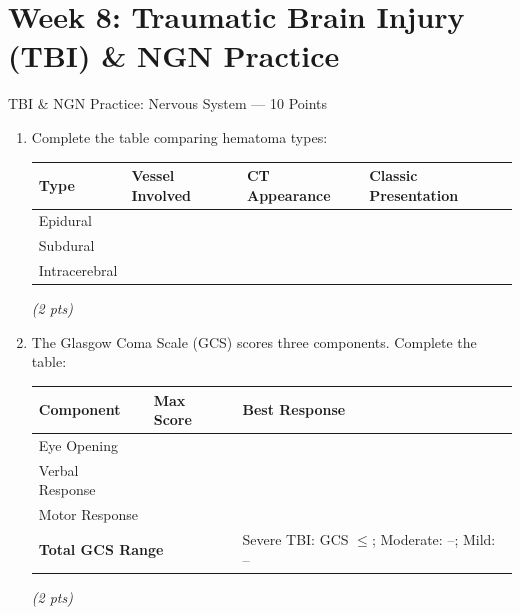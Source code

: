 \documentclass[11pt,letterpaper]{article}
\newcommand{\blank}[1][3cm]{\underline{\hspace{#1}}}
\begin{document}
\newpage

\section{Week 8: Traumatic Brain Injury (TBI) \& NGN Practice}

\begin{diagbox}{TBI \& NGN Practice: Nervous System --- 10 Points}

\begin{enumerate}[leftmargin=1.5em, label=\textbf{\arabic*.},start=81]

  \item Complete the table comparing hematoma types:

  \vspace{0.3cm}
  \begin{center}
  \renewcommand{\arraystretch}{1.7}
  \begin{tabular}{|p{3cm}|p{3.5cm}|p{3.5cm}|p{2.5cm}|}
  \hline
  \textbf{Type} & \textbf{Vessel Involved} & \textbf{CT Appearance} & \textbf{Classic Presentation} \\
  \hline
  Epidural & \blank[3cm] & \blank[3cm] & \blank[2cm] \\
  \hline
  Subdural & \blank[3cm] & \blank[3cm] & \blank[2cm] \\
  \hline
  Intracerebral & \blank[3cm] & \blank[3cm] & \blank[2cm] \\
  \hline
  \end{tabular}
  \end{center}
  \hfill\textit{(2 pts)}

  \item The Glasgow Coma Scale (GCS) scores three components.  Complete the table:

  \vspace{0.2cm}
  \begin{center}
  \renewcommand{\arraystretch}{1.6}
  \begin{tabular}{|p{4cm}|p{2cm}|p{5cm}|}
  \hline
  \textbf{Component} & \textbf{Max Score} & \textbf{Best Response} \\
  \hline
  Eye Opening      & \blank[1.5cm] & \blank[4.5cm] \\
  \hline
  Verbal Response  & \blank[1.5cm] & \blank[4.5cm] \\
  \hline
  Motor Response   & \blank[1.5cm] & \blank[4.5cm] \\
  \hline
  \multicolumn{2}{|l|}{\textbf{Total GCS Range}} & Severe TBI: GCS $\leq$\blank[1.2cm]; Moderate: \blank[1.2cm]--\blank[1.2cm]; Mild: \blank[1.2cm]--\blank[1.2cm] \\
  \hline
  \end{tabular}
  \end{center}
  \hfill\textit{(2 pts)}


\end{enumerate}
\end{diagbox}
\end{document}
